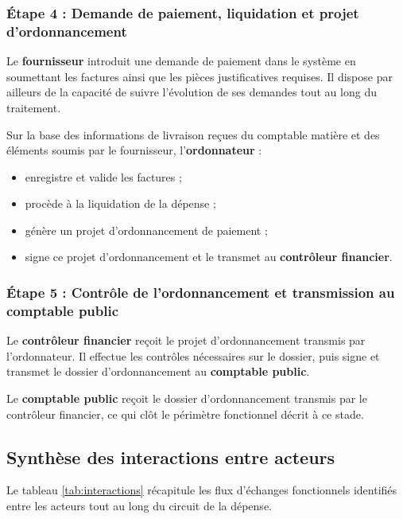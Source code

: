 \subsubsection{Étape 4 : Demande de paiement, liquidation et projet d'ordonnancement}
Le \textbf{fournisseur} introduit une demande de paiement dans le système en soumettant les factures ainsi que les pièces justificatives requises. Il dispose par ailleurs de la capacité de suivre l'évolution de ses demandes tout au long du traitement.

Sur la base des informations de livraison reçues du comptable matière et des éléments soumis par le fournisseur, l'\textbf{ordonnateur} :
\begin{itemize}
  \item enregistre et valide les factures ;
  \item procède à la liquidation de la dépense ;
  \item génère un projet d'ordonnancement de paiement ;
  \item signe ce projet d'ordonnancement et le transmet au \textbf{contrôleur financier}.
\end{itemize}

\subsubsection{Étape 5 : Contrôle de l'ordonnancement et transmission au comptable public}
Le \textbf{contrôleur financier} reçoit le projet d'ordonnancement transmis par l'ordonnateur. Il effectue les contrôles nécessaires sur le dossier, puis signe et transmet le dossier d'ordonnancement au \textbf{comptable public}.

Le \textbf{comptable public} reçoit le dossier d'ordonnancement transmis par le contrôleur financier, ce qui clôt le périmètre fonctionnel décrit à ce stade.

\subsection{Synthèse des interactions entre acteurs}

Le tableau \ref{tab:interactions} récapitule les flux d'échanges fonctionnels identifiés entre les acteurs tout au long du circuit de la dépense.

